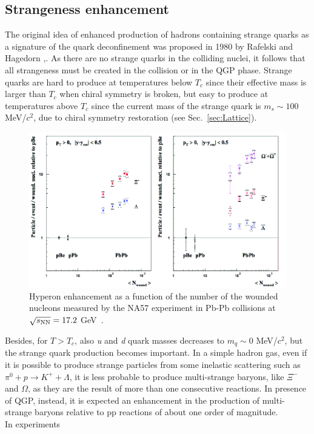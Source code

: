 \subsection{Strangeness enhancement}
\label{subsec:StrangEnhancSPS}
The original idea of enhanced production of hadrons containing strange quarks 
as a signature of the quark deconfinement was proposed in 1980 by Rafelski 
and Hagedorn \cite{PhysRevLett.48.1066},\cite{Muller:2011tu}. As there are no 
strange quarks in the colliding nuclei, it follows that all strangeness must be 
created in the collision or in the QGP phase. Strange quarks are hard to 
produce at temperatures below $T_c$ since their effective mass is larger 
than $T_c$ when chiral symmetry is broken, but easy to produce at temperatures 
above $T_c$ since the current mass of the strange quark is $m_s \sim 100$ MeV/$c^2$, 
due to chiral symmetry restoration (see Sec.~\ref{sec:Lattice}). 
\begin{figure}[!ht]
  \centering
  \includegraphics[width=12cm]{FigCap1/strangEnhancSPS.png}
  \caption{ Hyperon enhancement as a function of the number of the wounded nucleons measured by the NA57 experiment in Pb-Pb collisions at $\sqrt{s_{\rm NN}} = 17.2$ GeV~\cite{Sandor:2004bg}.}
  \label{fig:sEnhancSPS}
\end{figure}
Besides, for $T > T_c$, also \textit{u} and \textit{d} quark masses 
decreases to $m_q \sim 0$ MeV/$c^2$, but the 
strange quark production becomes important. In a simple hadron gas, 
even if it is possible to produce strange particles from some inelastic 
scattering such as $\pi^0+p \rightarrow K^++\Lambda$, it is less probable 
to produce multi-strange baryons, like $\Xi ^-$ and $\Omega$, as 
they are the result of more than one consecutive reactions. In presence 
of QGP, instead, it is expected an enhancement in the production of 
multi-strange baryons relative to pp reactions of about one order of magnitude. \\In experiments 
